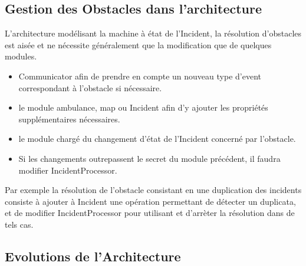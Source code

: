 \subsection{Gestion des Obstacles dans l'architecture}
	L'architecture modélisant la machine à état de l'Incident, 
	la résolution d'obstacles est aisée et ne nécessite généralement
	que la modification que de quelques modules.
	\begin{itemize}
		\item Communicator afin de prendre en compte un nouveau type
		 	d'event correspondant à l'obstacle si nécessaire.
		\item le module ambulance, map ou Incident afin d'y ajouter
			les propriétés supplémentaires nécessaires.
		\item le module chargé du changement d'état de l'Incident 
		      concerné par l'obstacle.
		\item Si les changements outrepassent le secret du module
			précédent, il faudra modifier IncidentProcessor.
	\end{itemize}
	
	Par exemple la résolution de l'obstacle consistant en une duplication
	des incidents consiste à ajouter à Incident une opération permettant
	de détecter un duplicata, et de modifier IncidentProcessor pour
	utilisant et d'arrèter la résolution dans de tels cas.

\subsection{Evolutions de l'Architecture}







